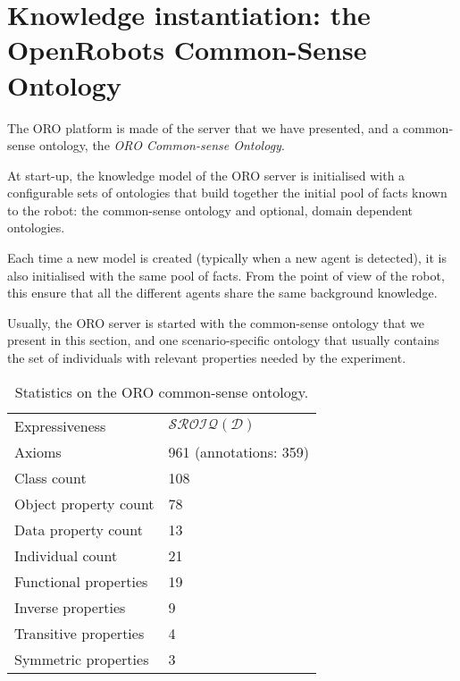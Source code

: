 
\section{Knowledge instantiation: the OpenRobots Common-Sense Ontology}
\label{sect|oro-commonsense}

The ORO platform is made of the server that we have presented, and a
common-sense ontology, the \emph{ORO Common-sense Ontology}.

At start-up, the knowledge model of the ORO server is initialised with a
configurable sets of ontologies that build together the initial pool of facts
known to the robot: the common-sense ontology and optional, domain dependent
ontologies.

Each time a new model is created (typically when a new agent is detected), it
is also initialised with the same pool of facts.  From the point of view of the
robot, this ensure that all the different agents share the same background
knowledge.

Usually, the ORO server is started with the common-sense ontology that we
present in this section, and one scenario-specific ontology that usually
contains the set of individuals with relevant properties needed by the
experiment.

\begin{table}
\begin{center}

\begin{tabular}{ll}
\toprule
Expressiveness & $\mathcal{SROIQ(D)}$ \\
Axioms & 961 (annotations: 359)\\
Class count & 108 \\
Object property count & 78 \\
Data property count & 13 \\
Individual count & 21 \\
Functional properties & 19 \\
Inverse properties & 9 \\
Transitive properties & 4 \\
Symmetric properties & 3 \\
\bottomrule

\end{tabular}
\end{center}

\caption{Statistics on the ORO common-sense ontology.}

\label{table|onto-stats}
\end{table}

